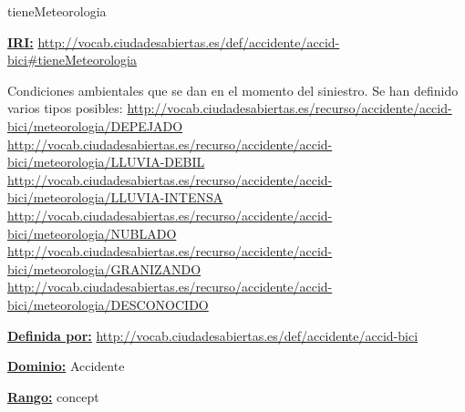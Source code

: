 \begin{mybox}{tieneMeteorologia}
\begin{flushleft}
\underline{\textbf{IRI:}}
\url{http://vocab.ciudadesabiertas.es/def/accidente/accid-bici#tieneMeteorologia}
\newline

Condiciones ambientales que se dan en el momento del siniestro. Se han definido varios tipos posibles:
\newline \url{http://vocab.ciudadesabiertas.es/recurso/accidente/accid-bici/meteorologia/DEPEJADO}
\newline \url{http://vocab.ciudadesabiertas.es/recurso/accidente/accid-bici/meteorologia/LLUVIA-DEBIL}
\newline \url{http://vocab.ciudadesabiertas.es/recurso/accidente/accid-bici/meteorologia/LLUVIA-INTENSA}
\newline \url{http://vocab.ciudadesabiertas.es/recurso/accidente/accid-bici/meteorologia/NUBLADO}
\newline \url{http://vocab.ciudadesabiertas.es/recurso/accidente/accid-bici/meteorologia/GRANIZANDO}
\newline \url{http://vocab.ciudadesabiertas.es/recurso/accidente/accid-bici/meteorologia/DESCONOCIDO}
\newline

\underline{\textbf{Definida por:}}
\url{http://vocab.ciudadesabiertas.es/def/accidente/accid-bici}
\newline

\underline{\textbf{Dominio:}} 
\newline Accidente
\newline

\underline{\textbf{Rango:}}
\newline concept
\newline

\end{flushleft}
\end{mybox}





